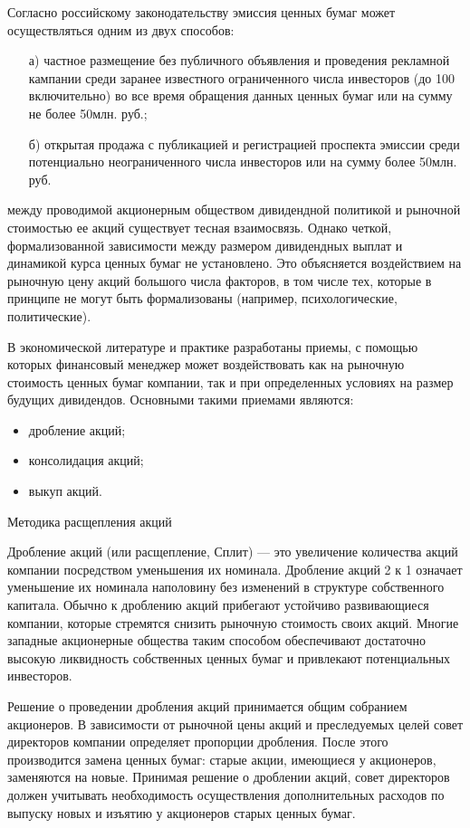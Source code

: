 Согласно российскому законодательству эмиссия ценных бумаг может осуществляться одним из двух способов: 
\begin{itemize}
	\item [а)] частное размещение без публичного объявления и проведения рекламной кампании среди заранее известного ограниченного числа инвесторов (до 100 включительно) во все время обращения данных ценных бумаг или на сумму не более 50млн. руб.; 
	\item [б)] открытая продажа с публикацией и регистрацией проспекта эмиссии среди потенциально неограниченного числа инвесторов или на сумму более 50млн. руб. 
\end{itemize}

между проводимой акционерным обществом дивидендной политикой и рыночной стоимостью ее акций существует тесная взаимосвязь. Однако четкой, формализованной зависимости между размером дивидендных выплат и динамикой курса ценных бумаг не установлено. Это объясняется воздействием на рыночную цену акций большого числа факторов, в том числе тех, которые в принципе не могут быть формализованы (например, психологические, политические).

В экономической литературе и практике разработаны приемы, с помощью которых финансовый менеджер может воздействовать как на рыночную стоимость ценных бумаг компании, так и при определенных условиях на размер будущих дивидендов. Основными такими приемами являются:
\begin{itemize}
	\item дробление акций;
	\item консолидация акций;
	\item выкуп акций.
\end{itemize}

Методика расщепления акций

Дробление акций (или расщепление, Сплит) --- это увеличение количества акций компании посредством уменьшения их номинала. Дробление акций 2 к 1 означает уменьшение их номинала наполовину без изменений в структуре собственного капитала. Обычно к дроблению акций прибегают устойчиво развивающиеся компании, которые стремятся снизить рыночную стоимость своих акций. Многие западные акционерные общества таким способом обеспечивают достаточно высокую ликвидность собственных ценных бумаг и привлекают потенциальных инвесторов.

Решение о проведении дробления акций принимается общим собранием акционеров. В зависимости от рыночной цены акций и преследуемых целей совет директоров компании определяет пропорции дробления. После этого производится замена ценных бумаг: старые акции, имеющиеся у акционеров, заменяются на новые. Принимая решение о дроблении акций, совет директоров должен учитывать необходимость осуществления дополнительных расходов по выпуску новых и изъятию у акционеров старых ценных бумаг.

